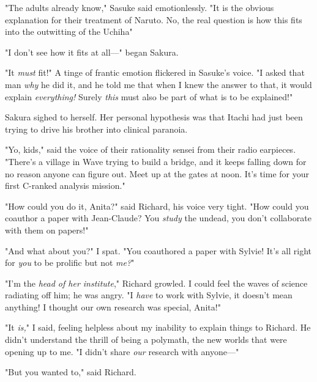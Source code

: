 "The adults already know," Sasuke said emotionlessly. "It is the obvious
explanation for their treatment of Naruto. No, the real question is how this
fits into the outwitting of the Uchiha{\el}"

"I don't see how it fits at all\mbox{---}" began Sakura.

"It \emph{must} fit!" A tinge of frantic emotion flickered in Sasuke's voice.
"I asked that man \emph{why} he did it, and he told me that when I knew the
answer to that, it would explain \emph{everything!} Surely \emph{this} must
also be part of what is to be explained!"

Sakura sighed to herself. Her personal hypothesis was that Itachi had just been
trying to drive his brother into clinical paranoia.

\enlargethispage{.5\baselineskip}
"Yo, kids," said the voice of their rationality sensei from their radio
earpieces. "There's a village in Wave trying to build a bridge, and it keeps
falling down for no reason anyone can figure out. Meet up at the gates at noon.
It's time for your first C-ranked analysis mission."
%
\vspace{-.5\baselineskip}
\sbreak

\noindent{}"How could you do it, Anita?" said Richard, his voice very tight. "How could
you coauthor a paper with Jean-Claude? You \emph{study} the undead, you don't
collaborate with them on papers!"

"And what about you?" I spat. "You coauthored a paper with Sylvie! It's all
right for \emph{you} to be prolific but not \emph{me?}"

"I'm the \emph{head of her institute}," Richard growled. I could feel the waves
of science radiating off him; he was angry. "I \emph{have} to work with Sylvie,
it doesn't mean anything! I thought our own research was special, Anita!"

"It \emph{is,}" I said, feeling helpless about my inability to explain things
to Richard. He didn't understand the thrill of being a polymath, the new worlds
that were opening up to me. "I didn't share \emph{our} research with anyone\mbox{---}"

"But you wanted to," said Richard.

